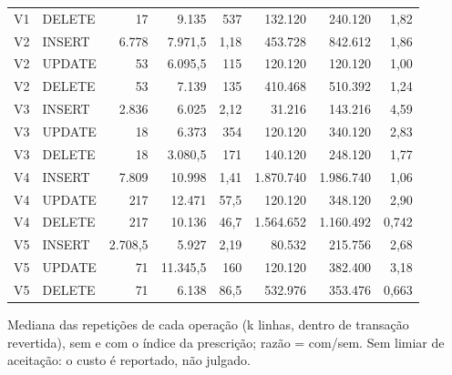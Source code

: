 {\begin{tabular}{llrrrrrr}
V1 & DELETE & 17 & 9.135 & 537 & 132.120 & 240.120 & 1,82 \\
V2 & INSERT & 6.778 & 7.971,5 & 1,18 & 453.728 & 842.612 & 1,86 \\
V2 & UPDATE & 53 & 6.095,5 & 115 & 120.120 & 120.120 & 1,00 \\
V2 & DELETE & 53 & 7.139 & 135 & 410.468 & 510.392 & 1,24 \\
V3 & INSERT & 2.836 & 6.025 & 2,12 & 31.216 & 143.216 & 4,59 \\
V3 & UPDATE & 18 & 6.373 & 354 & 120.120 & 340.120 & 2,83 \\
V3 & DELETE & 18 & 3.080,5 & 171 & 140.120 & 248.120 & 1,77 \\
V4 & INSERT & 7.809 & 10.998 & 1,41 & 1.870.740 & 1.986.740 & 1,06 \\
V4 & UPDATE & 217 & 12.471 & 57,5 & 120.120 & 348.120 & 2,90 \\
V4 & DELETE & 217 & 10.136 & 46,7 & 1.564.652 & 1.160.492 & 0,742 \\
V5 & INSERT & 2.708,5 & 5.927 & 2,19 & 80.532 & 215.756 & 2,68 \\
V5 & UPDATE & 71 & 11.345,5 & 160 & 120.120 & 382.400 & 3,18 \\
V5 & DELETE & 71 & 6.138 & 86,5 & 532.976 & 353.476 & 0,663 \\
\bottomrule
\end{tabular}\par
\vspace{3pt}
\begin{minipage}{\linewidth}\footnotesize
Mediana das repetições de cada operação (k linhas, dentro de transação revertida), sem e com o índice da prescrição; razão = com/sem. Sem limiar de aceitação: o custo é reportado, não julgado.
\end{minipage}
}
